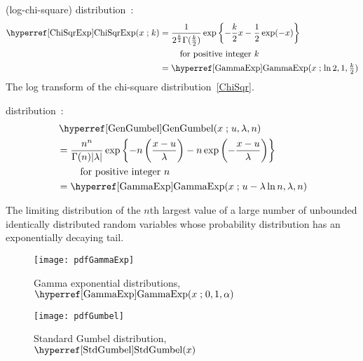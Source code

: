  (log-chi-square) distribution~\cite{Lee2012}:
\begin{align}
\label{ChiSqrExp}
\opr{ChiSqrExp}(x\given k) 
 &= \notag
\frac{1}{2^{\frac{k}{2}} \Gamma(\frac{k}{2})}  \exp\left\{- \frac{k}{2} x - \frac{1}{2} \exp(-x)  \right\} \checked
\\ & \qquad \text{ for positive integer } k
\\
&= \opr{GammaExp}(x\given \ln 2, 1 ,\tfrac{k}{2}) \checked
\notag
\end{align}
The log transform of the chi-square distribution~\eqref{ChiSqr}.


 distribution~\cite{Gumbel1958,Johnson1995}: 
\begin{align}
\label{GenGumbel}
&\opr{GenGumbel}(x\given u,{\lambda},n) 
\\ \notag  &= \notag
\frac{n^n}{\Gamma(n) |{\lambda}|}  \exp\left\{ - n \left(\frac{x-u}{{\lambda}}\right) - n \exp\left(- \frac{x-u}{{\lambda}}\right)  \right\} \checked
\\ & \qquad \text{ for positive integer } n
\notag
\\
&= \opr{GammaExp}(x\given u-{\lambda} \ln n,{\lambda},n) \checked
\notag
\end{align}

The limiting distribution of the $n$th largest value of a large number of unbounded identically distributed random variables whose probability distribution has an exponentially decaying tail.


\begin{figure}[t]
\begin{center}
\texttt{[image: pdfGammaExp]}   
\end{center}
\caption[Gamma exponential distributions]{Gamma exponential distributions, $\opr{GammaExp}(x\given 0,1,\alpha)$} 
\end{figure}


\begin{figure}[t]
\begin{center}
\texttt{[image: pdfGumbel]}  
\end{center}
\caption[Gumbel distribution]{Standard Gumbel distribution, $\opr{StdGumbel}(x)$} 
\end{figure}


